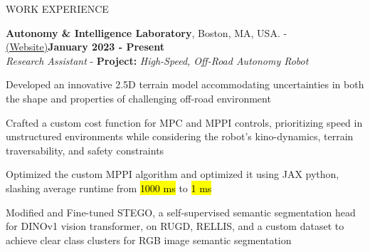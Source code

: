 \documentclass{resume} %
\begin{document}
    \begin{rSection}{WORK EXPERIENCE}
	\begin{rSubsectiond}{\textbf{Autonomy \& Intelligence Laboratory}, Boston, MA, USA. - \href{https://neu-autonomy.github.io/lab_website/team/}{(Website)}}{\textbf{January 2023 - Present} \\\textit{Research Assistant} - \textbf{Project:} \textit{High-Speed, Off-Road Autonomy Robot}}
        \item Developed an innovative 2.5D terrain model accommodating uncertainties in both the shape and properties of challenging off-road environment
        \item Crafted a custom cost function for MPC and MPPI controls, prioritizing speed in unstructured environments while considering the robot's kino-dynamics, terrain traversability, and safety constraints
        \item Optimized the custom MPPI algorithm and optimized it using JAX python, slashing average runtime from \hl{1000 ms} to \hl{1 ms}
        \item Modified and Fine-tuned STEGO, a self-supervised semantic segmentation head for DINOv1 vision transformer, on RUGD, RELLIS, and a custom dataset to achieve clear class clusters for RGB image semantic segmentation

\end{rSubsectiond}
\end{rSection}
\end{document}
